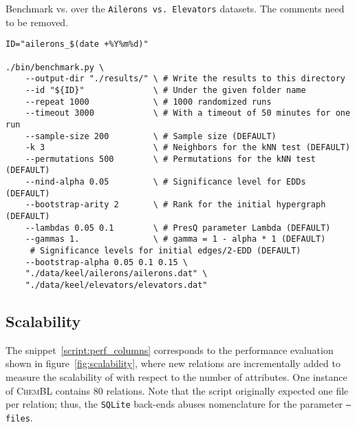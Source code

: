 \begin{code}
\caption[Benchmark \Find vs. \PresQ over the \texttt{Ailerons vs Elevators} datasets.]{
Benchmark \Find vs. \PresQ over the \texttt{Ailerons vs. Elevators} datasets. The comments need to be removed.}\label{script:edd_finding}
\begin{verbatim}
ID="ailerons_$(date +%Y%m%d)"

./bin/benchmark.py \
    --output-dir "./results/" \ # Write the results to this directory
    --id "${ID}"              \ # Under the given folder name
    --repeat 1000             \ # 1000 randomized runs
    --timeout 3000            \ # With a timeout of 50 minutes for one run
    --sample-size 200         \ # Sample size (DEFAULT)
    -k 3                      \ # Neighbors for the kNN test (DEFAULT)
    --permutations 500        \ # Permutations for the kNN test (DEFAULT)
    --nind-alpha 0.05         \ # Significance level for EDDs (DEFAULT)
    --bootstrap-arity 2       \ # Rank for the initial hypergraph (DEFAULT)
    --lambdas 0.05 0.1        \ # PresQ parameter Lambda (DEFAULT)
    --gammas 1.               \ # gamma = 1 - alpha * 1 (DEFAULT)
     # Significance levels for initial edges/2-EDD (DEFAULT)
    --bootstrap-alpha 0.05 0.1 0.15 \
    "./data/keel/ailerons/ailerons.dat" \
    "./data/keel/elevators/elevators.dat"
\end{verbatim}
\end{code}

\subsection{Scalability}

The snippet~\ref{script:perf_columns} corresponds to the performance evaluation shown
in figure~\ref{fig:scalability}, where new relations are incrementally added to measure
the scalability of \PresQ with respect to the number of attributes.
One instance of \textsc{ChemBL} contains 80 relations. Note that the script
originally expected one file per relation; thus, the \texttt{SQLite} back-ends abuses
nomenclature for the parameter \texttt{--files}.

